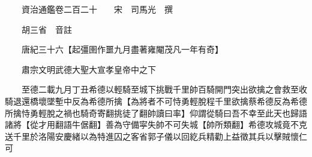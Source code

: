 










 


 
 


 

  
  
  
  
  





  
  
  
  
  
 
  

  

  
  
  



  

 
 

  
   




  

  
  


  　　資治通鑑卷二百二十　　宋　司馬光　撰

　　胡三省　音註

　　唐紀三十六【起彊圉作噩九月盡著雍閹茂凡一年有奇】

　　肅宗文明武德大聖大宣孝皇帝中之下

　　至德二載九月丁丑希德以輕騎至城下挑戰千里帥百騎開門突出欲擒之會救至收騎退還橋壞墜塹中反為希德所擒【為將者不可恃勇輕脫程千里欲擒蔡希德反為希德所擒恃勇輕脫之禍也騎奇寄翻挑徒了翻帥讀曰率】仰謂從騎曰吾不幸至此天也歸語諸將【從才用翻語牛倨翻】善為守備寜失帥不可失城【帥所類翻】希德攻城竟不克送千里於洛陽安慶緒以為特進囚之客省郭子儀以回紇兵精勸上益徵其兵以擊賊懷仁可

